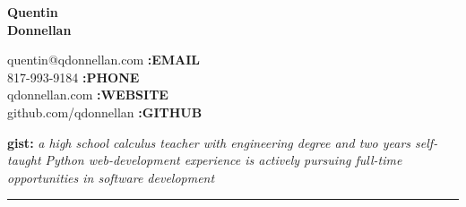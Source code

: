 \documentclass{article}
\begin{document}
\begin{multicols}{2}

{\bfseries
	{\Huge Quentin } \\
	{\Huge Donnellan }
}
\columnbreak


{\raggedleft
	quentin@qdonnellan.com {\bf :EMAIL}\\
	817-993-9184 {\bf :PHONE}\\
	qdonnellan.com {\bf :WEBSITE}\\
	github.com/qdonnellan {\bf :GITHUB}\\
}


\end{multicols}
\textbf{\large gist:} \textit{\large a high school calculus teacher with engineering degree and two years self-taught Python web-development experience is actively pursuing full-time opportunities in software development }
\begin{center}
\rule{\textwidth}{8pt}
\end{center}
\end{document}
